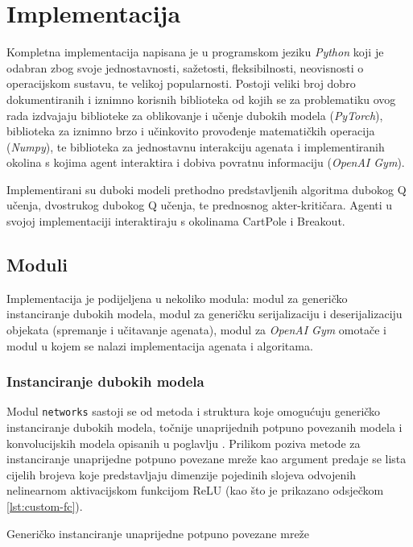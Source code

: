 \chapter{Implementacija}

Kompletna implementacija napisana je u programskom jeziku \textit{Python} koji je odabran zbog svoje jednostavnosti, sažetosti, fleksibilnosti, neovisnosti o operacijskom sustavu, te velikoj popularnosti. Postoji veliki broj dobro dokumentiranih i iznimno korisnih biblioteka od kojih se za problematiku ovog rada izdvajaju biblioteke za oblikovanje i učenje dubokih modela (\textit{PyTorch}), biblioteka za iznimno brzo i učinkovito provođenje matematičkih operacija (\textit{Numpy}), te biblioteka za jednostavnu interakciju agenata i implementiranih okolina s kojima agent interaktira i dobiva povratnu informaciju (\textit{OpenAI Gym}).

Implementirani su duboki modeli prethodno predstavljenih algoritma dubokog Q učenja, dvostrukog dubokog Q učenja, te prednosnog akter-kritičara. Agenti u svojoj implementaciji interaktiraju s okolinama CartPole i Breakout.

\section{Moduli}

Implementacija je podijeljena u nekoliko modula: modul za generičko instanciranje dubokih modela, modul za generičku serijalizaciju i deserijalizaciju objekata (spremanje i učitavanje agenata), modul za \textit{OpenAI Gym} omotače i modul u kojem se nalazi implementacija agenata i algoritama.

\subsection{Instanciranje dubokih modela}

Modul \texttt{networks} sastoji se od metoda i struktura koje omogućuju generičko instanciranje dubokih modela, točnije unaprijednih potpuno povezanih modela i konvolucijskih modela opisanih u poglavlju . Prilikom poziva metode za instanciranje unaprijedne potpuno povezane mreže kao argument predaje se lista cijelih brojeva koje predstavljaju dimenzije pojedinih slojeva odvojenih nelinearnom aktivacijskom funkcijom ReLU (kao što je prikazano odsječkom \ref{lst:custom-fc}).

\begin{listing}[H]
    \caption{Generičko instanciranje unaprijedne potpuno povezane mreže}
    \inputminted{python}{snippets/custom-fc.py}
    \label{lst:custom-fc}
\end{listing}

